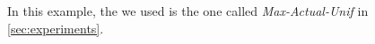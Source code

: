 
In this example, the \grow we used is the one called \emph{Max-Actual-Unif} in \cref{sec:experiments}. 

% 
% 





